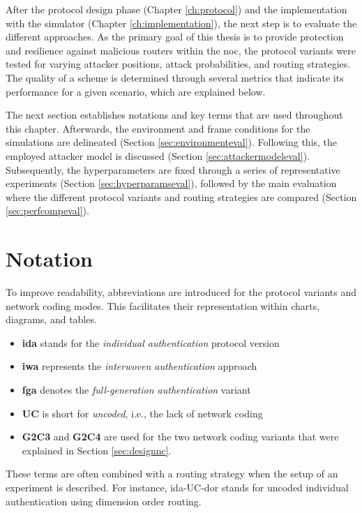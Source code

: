 After the protocol design phase (Chapter \ref{ch:protocol}) and the implementation with the simulator (Chapter \ref{ch:implementation}), the next step
is to evaluate the different approaches. As the primary goal of this thesis is to provide protection and resilience against malicious routers within
the \gls{noc}, the protocol variants were tested for varying attacker positions, attack probabilities, and routing strategies. The quality of a scheme
is determined through several metrics that indicate its performance for a given scenario, which are explained below.

The next section establishes notations and key terms that are used throughout this chapter. Afterwards, the environment and frame conditions for the
simulations are delineated (Section \ref{sec:environmenteval}). Following this, the employed attacker model is discussed (Section
\ref{sec:attackermodeleval}). Subsequently, the hyperparameters are fixed through a series of representative experiments (Section
\ref{sec:hyperparamseval}), followed by the main evaluation where the different protocol variants and routing strategies are compared (Section
\ref{sec:perfcompeval}).

\section{Notation}\label{sec:notationeval}
To improve readability, abbreviations are introduced for the protocol variants and network coding modes. This facilitates their representation within
charts, diagrams, and tables.
\begin{itemize}
    \item \textbf{\Gls{ida}} stands for the \textit{individual authentication} protocol version
    \item \textbf{\Gls{iwa}} represents the \textit{interwoven authentication} approach
    \item \textbf{\Gls{fga}} denotes the \textit{full-generation authentication} variant
    \item \textbf{UC} is short for \textit{uncoded}, i.e., the lack of network coding
    \item \textbf{G2C3} and \textbf{G2C4} are used for the two network coding variants that were explained in Section \ref{sec:designnc}.
\end{itemize}
\vspace{0.5\baselineskip}

These terms are often combined with a routing strategy when the setup of an experiment is described. For instance, \gls{ida}-UC-\gls{dor} stands for uncoded
individual authentication using dimension order routing.

